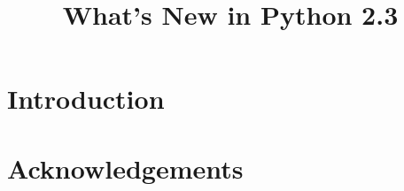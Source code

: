 \documentclass{howto}
\title{What's New in Python 2.3}
\begin{document}
\maketitle
\tableofcontents

\section{Introduction \label{intro}}




\section{Acknowledgements \label{acks}}
\end{document}
